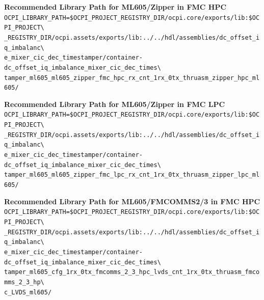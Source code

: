 \noindent\textbf{Recommended Library Path for ML605/Zipper in FMC HPC}\\

\noindent
\verb|OCPI_LIBRARY_PATH=$OCPI_PROJECT_REGISTRY_DIR/ocpi.core/exports/lib:$OCPI_PROJECT\| \\
\verb|_REGISTRY_DIR/ocpi.assets/exports/lib:../../hdl/assemblies/dc_offset_iq_imbalanc\| \\
\verb|e_mixer_cic_dec_timestamper/container-dc_offset_iq_imbalance_mixer_cic_dec_times\| \\
\verb|tamper_ml605_ml605_zipper_fmc_hpc_rx_cnt_1rx_0tx_thruasm_zipper_hpc_ml605/|
\par\medskip

\noindent\textbf{Recommended Library Path for ML605/Zipper in FMC LPC}\\

\noindent
\verb|OCPI_LIBRARY_PATH=$OCPI_PROJECT_REGISTRY_DIR/ocpi.core/exports/lib:$OCPI_PROJECT\| \\
\verb|_REGISTRY_DIR/ocpi.assets/exports/lib:../../hdl/assemblies/dc_offset_iq_imbalanc\| \\
\verb|e_mixer_cic_dec_timestamper/container-dc_offset_iq_imbalance_mixer_cic_dec_times\| \\
\verb|tamper_ml605_ml605_zipper_fmc_lpc_rx_cnt_1rx_0tx_thruasm_zipper_lpc_ml605/|
\par\medskip

\noindent\textbf{Recommended Library Path for ML605/FMCOMMS2/3 in FMC HPC}\\

\noindent
\verb|OCPI_LIBRARY_PATH=$OCPI_PROJECT_REGISTRY_DIR/ocpi.core/exports/lib:$OCPI_PROJECT\| \\
\verb|_REGISTRY_DIR/ocpi.assets/exports/lib:../../hdl/assemblies/dc_offset_iq_imbalanc\| \\
\verb|e_mixer_cic_dec_timestamper/container-dc_offset_iq_imbalance_mixer_cic_dec_times\| \\
\verb|tamper_ml605_cfg_1rx_0tx_fmcomms_2_3_hpc_lvds_cnt_1rx_0tx_thruasm_fmcomms_2_3_hp\| \\
\verb|c_LVDS_ml605/|
\par\medskip

